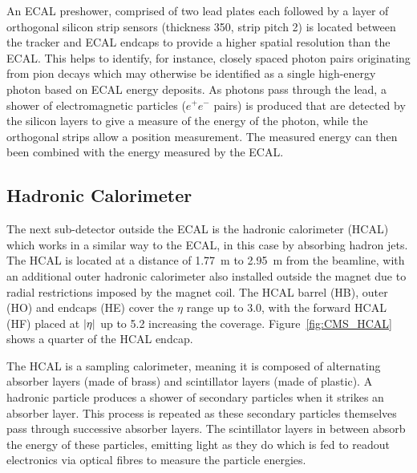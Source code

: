 An ECAL preshower, comprised of two lead plates each followed by a layer of orthogonal silicon strip sensors
(thickness 350\mm, strip pitch 2\mm) is located between the tracker and ECAL endcaps to provide a higher
spatial resolution than the ECAL. This helps to identify, for instance, closely spaced photon pairs
originating from pion decays which may otherwise be identified as a single high-energy photon based on ECAL
energy deposits. As photons pass through the lead, a shower of electromagnetic particles ($e^{+}e^{-}$ pairs)
is produced that are detected by the silicon layers to give a measure of the energy of the photon, while the
orthogonal strips allow a position measurement. The measured energy can then been combined with the energy
measured by the ECAL.

\subsection{Hadronic Calorimeter}
\label{ss:Hcal}
The next sub-detector outside the ECAL is the hadronic calorimeter (HCAL) which works in a similar way to
the ECAL, in this case by absorbing hadron jets. The HCAL is located at a distance of 1.77~m to 2.95~m from
the beamline, with an additional outer hadronic calorimeter also installed outside the magnet due to
radial restrictions imposed by the magnet coil. The HCAL barrel (HB), outer (HO) and endcaps (HE) cover
the $\eta$ range up to 3.0, with the forward HCAL (HF) placed at $|\eta|$ up to 5.2 increasing the coverage.
Figure~\ref{fig:CMS_HCAL} shows a quarter of the HCAL endcap.

The HCAL is a sampling calorimeter, meaning it is composed of alternating absorber layers (made of brass) and
scintillator layers (made of plastic). A hadronic particle produces a shower of secondary particles when it
strikes an absorber layer. This process is repeated as these secondary particles themselves pass through
successive absorber layers. The scintillator layers in between absorb the energy of these particles, emitting
light as they do which is fed to readout electronics via optical fibres to measure the particle energies. 

